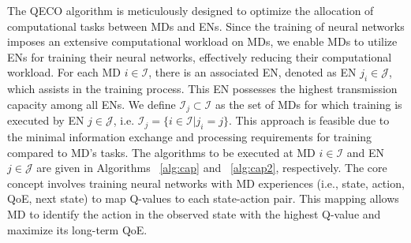 \documentclass[10pt, journal,letterpaper]{IEEEtran}
\begin{document}

The QECO algorithm is meticulously designed to optimize the allocation of computational tasks between MDs and ENs. Since the training of neural networks imposes an extensive computational workload on MDs, we enable MDs to utilize ENs for training their neural networks, effectively reducing their computational workload. For each MD $i \in \mathcal{I}$, there is an associated EN, denoted as EN $j_i \in \mathcal{J}$, which assists in the training process. This EN possesses the highest transmission capacity among all ENs. We define $\mathcal{I}_j \subset \mathcal{I}$ as the set of MDs for which training is executed by EN $j \in \mathcal{J}$, i.e. $\mathcal{I}_j = \{i \in \mathcal{I} | j_i = j\}$. This approach is feasible due to the minimal information exchange and processing requirements for training compared to MD's tasks. The algorithms to be executed at MD $i \in \mathcal{I}$ and EN $j \in \mathcal{J}$ are given in Algorithms ~\ref{alg:cap} and ~\ref{alg:cap2}, respectively. The core concept involves training neural networks with MD experiences (i.e., state, action, QoE, next state) to map Q-values to each state-action pair. This mapping allows MD to identify the action in the observed state with the highest Q-value and maximize its long-term QoE.
\end{document}
